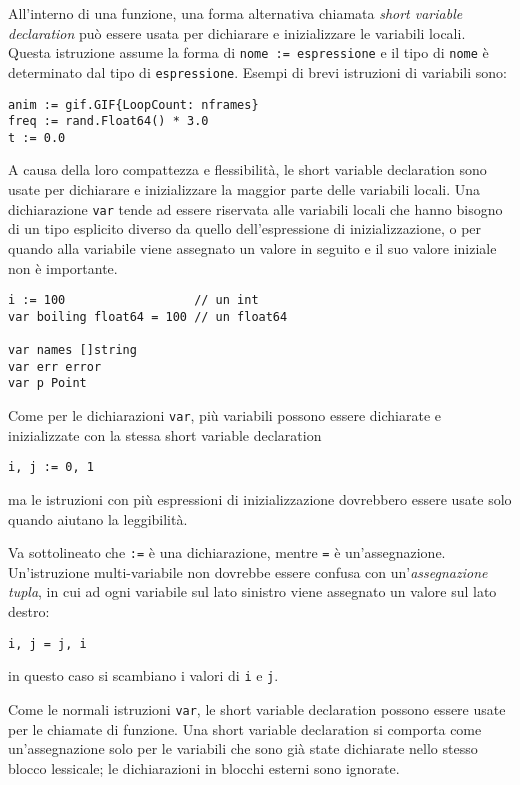%
All'interno di una funzione, una forma alternativa chiamata \textit{short variable declaration} può essere usata per dichiarare e inizializzare le variabili locali.
Questa istruzione assume la forma di \verb|nome := espressione| e il tipo di \verb|nome| è determinato dal tipo di \verb|espressione|.
Esempi di brevi istruzioni di variabili sono:
\begin{lstlisting}[frame=single, label={lst:lstlisting1-3-1.1}]
anim := gif.GIF{LoopCount: nframes}
freq := rand.Float64() * 3.0
t := 0.0
\end{lstlisting}
A causa della loro compattezza e flessibilità, le short variable declaration sono usate per dichiarare e inizializzare la maggior parte delle variabili locali.
Una dichiarazione \verb|var| tende ad essere riservata alle variabili locali che hanno bisogno di un tipo esplicito diverso da quello dell'espressione di inizializzazione, o per quando alla variabile viene assegnato un valore in seguito e il suo valore iniziale non è importante.
\begin{lstlisting}[frame=single, label={lst:lstlisting1-3-1.2}]
i := 100                  // un int
var boiling float64 = 100 // un float64

var names []string
var err error
var p Point
\end{lstlisting}
Come per le dichiarazioni \verb|var|, più variabili possono essere dichiarate e inizializzate con la stessa short variable declaration
\begin{lstlisting}[frame=single, label={lst:lstlisting1-3-1.3}]
i, j := 0, 1
\end{lstlisting}
ma le istruzioni con più espressioni di inizializzazione dovrebbero essere usate solo quando aiutano la leggibilità.

Va sottolineato che \verb|:=| è una dichiarazione, mentre \verb|=| è un'assegnazione.
Un'istruzione multi-variabile non dovrebbe essere confusa con un'\textit{assegnazione tupla}, in cui ad ogni variabile sul lato sinistro viene assegnato un valore sul lato destro:
\begin{lstlisting}[frame=single, label={lst:lstlisting1-3-1.4}]
i, j = j, i
\end{lstlisting}
in questo caso si scambiano i valori di \verb|i| e \verb|j|.

Come le normali istruzioni \verb|var|, le short variable declaration possono essere usate per le chiamate di funzione.
Una short variable declaration si comporta come un'assegnazione solo per le variabili che sono già state dichiarate nello stesso blocco lessicale;
le dichiarazioni in blocchi esterni sono ignorate.

